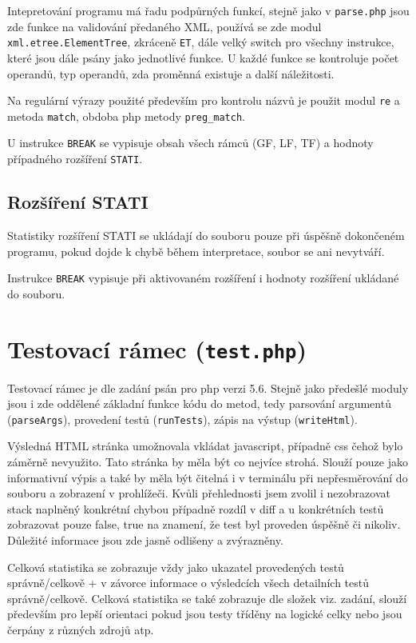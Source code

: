 \documentclass[a4paper,10pt]{article}
\begin{document}
  Intepretování programu má řadu podpůrných funkcí, stejně jako v \texttt{parse.php} jsou zde funkce na validování předaného XML, používá se zde modul \texttt{xml.etree.ElementTree}, zkráceně \texttt{ET}, dále velký switch pro všechny
  instrukce, které jsou dále psány jako jednotlivé funkce. U každé funkce se kontroluje počet operandů, typ operandů, zda proměnná existuje a další náležitosti.

  Na regulární výrazy použité především pro kontrolu názvů je použit modul \texttt{re} a metoda \texttt{match}, obdoba php metody \texttt{preg\_match}.

  U instrukce \texttt{BREAK} se vypisuje obsah všech rámců (GF, LF, TF) a hodnoty případného rozšíření \texttt{STATI}.

\subsection{Rozšíření STATI}
  Statistiky rozšíření STATI se ukládají do souboru pouze při úspěšně dokončeném programu, pokud dojde k chybě během interpretace, soubor se ani nevytváří.

  Instrukce \texttt{BREAK} vypisuje při aktivovaném rozšíření i hodnoty rozšíření ukládané do souboru.

\section{Testovací rámec (\texttt{test.php})}
  Testovací rámec je dle zadání psán pro php verzi 5.6. Stejně jako předešlé moduly jsou i zde oddělené základní funkce kódu do metod, tedy parsování argumentů (\texttt{parseArgs}), provedení testů (\texttt{runTests}), zápis na výstup (\texttt{writeHtml}).

  Výsledná HTML stránka umožnovala vkládat javascript, případně css čehož bylo záměrně nevyužito. Tato stránka by měla být co nejvíce strohá.
  Slouží pouze jako informativní výpis a také by měla být čitelná i v terminálu při nepřesměrování do souboru a zobrazení v prohlížeči. Kvůli přehlednosti jsem zvolil i nezobrazovat stack naplněný konkrétní chybou případně rozdíl v diff a u konkrétních testů
  zobrazovat pouze false, true na znamení, že test byl proveden úspěšně či nikoliv. Důležité informace jsou zde jasně odlišeny a zvýrazněny.

  Celková statistika se zobrazuje vždy jako ukazatel provedených testů správně/celkově + v závorce informace o výsledcích všech detailních testů správně/celkově.
  Celková statistika se také zobrazuje dle složek viz. zadání, slouží především pro lepší orientaci pokud jsou testy tříděny na logické celky nebo jsou čerpány z různých zdrojů atp.
\end{document}
